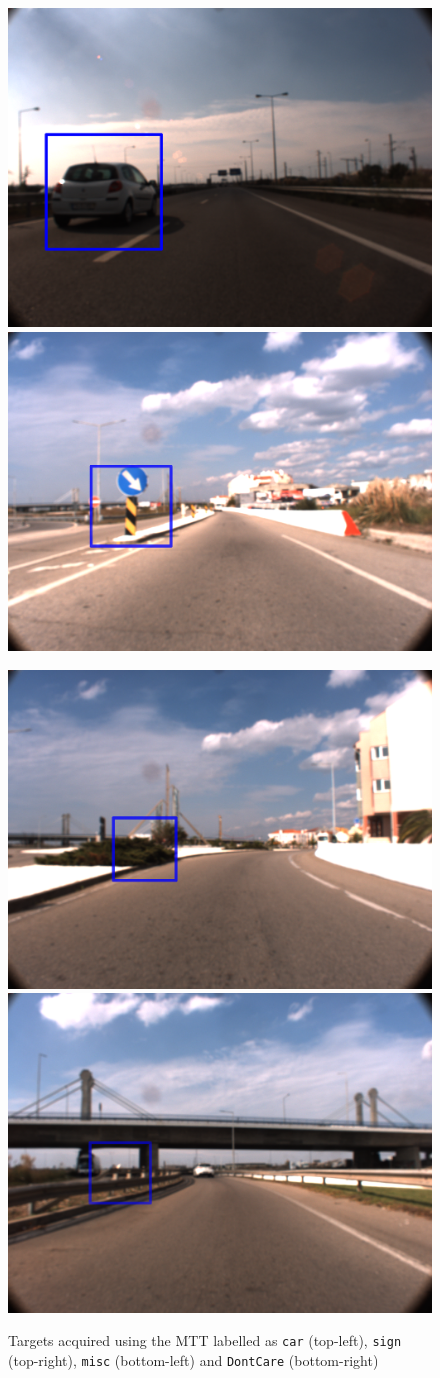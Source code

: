 \begin{figure}[htp]
	
	\centering
	
	\includegraphics[width=.49\textwidth]{capresults/imgs/car1.png}
	\includegraphics[width=.49\textwidth]{capresults/imgs/sign1.png}
	
	\includegraphics[width=.49\textwidth]{capresults/imgs/misc1.png}
	\includegraphics[width=.49\textwidth]{capresults/imgs/dontcare1.png}
	
	\caption{Targets acquired using the MTT labelled as \texttt{car} (top-left), \texttt{sign} (top-right), \texttt{misc} (bottom-left) and \texttt{DontCare} (bottom-right)}
	\label{fig:dataset1results1}
	
\end{figure}

